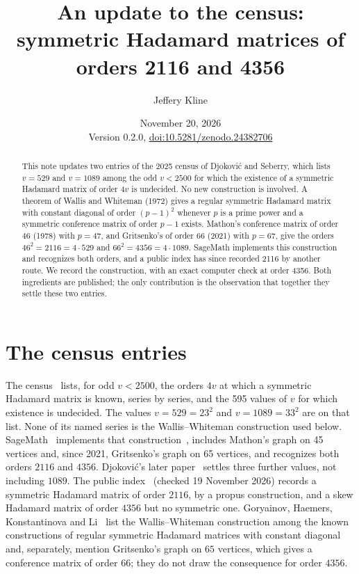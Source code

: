 \documentclass[10pt]{article}
\title{An update to the census: symmetric Hadamard matrices of orders 2116 and 4356}
\author{Jeffery Kline}
\date{November 20, 2026\\[3pt]\small Version 0.2.0, \href{https://doi.org/10.5281/zenodo.24382706}{doi:10.5281/zenodo.24382706}}
\begin{document}
\maketitle

\begin{abstract}
This note updates two entries of the 2025 census of Djokovi\'c and Seberry, which lists $v=529$ and $v=1089$ among the odd $v<2500$ for which the existence of a symmetric Hadamard matrix of order $4v$ is undecided. No new construction is involved. A theorem of Wallis and Whiteman (1972) gives a regular symmetric Hadamard matrix with constant diagonal of order $(p-1)^2$ whenever $p$ is a prime power and a symmetric conference matrix of order $p-1$ exists. Mathon's conference matrix of order $46$ (1978) with $p=47$, and Gritsenko's of order $66$ (2021) with $p=67$, give the orders $46^2=2116=4\cdot529$ and $66^2=4356=4\cdot1089$. SageMath implements this construction and recognizes both orders, and a public index has since recorded 2116 by another route. We record the construction, with an exact computer check at order 4356. Both ingredients are published; the only contribution is the observation that together they settle these two entries.
\end{abstract}

\section{The census entries}
The census~\cite{DS} lists, for odd $v<2500$, the orders $4v$ at which a symmetric Hadamard matrix is known, series by series, and the 595 values of $v$ for which existence is undecided. The values $v=529=23^2$ and $v=1089=33^2$ are on that list. None of its named series is the Wallis--Whiteman construction used below. SageMath~\cite{SAGE} implements that construction~\cite[Theorem~16, Corollary~17]{WW}, includes Mathon's graph on 45 vertices and, since 2021, Gritsenko's graph on 65 vertices, and recognizes both orders $2116$ and $4356$. Djokovi\'c's later paper~\cite{D25} settles three further values, not including $1089$. The public index~\cite{GSI} (checked 19 November 2026) records a symmetric Hadamard matrix of order $2116$, by a propus construction, and a skew Hadamard matrix of order $4356$ but no symmetric one. Goryainov, Haemers, Konstantinova and Li~\cite{GHKL} list the Wallis--Whiteman construction among the known constructions of regular symmetric Hadamard matrices with constant diagonal and, separately, mention Gritsenko's graph on $65$ vertices, which gives a conference matrix of order $66$; they do not draw the consequence for order $4356$.
\end{document}

